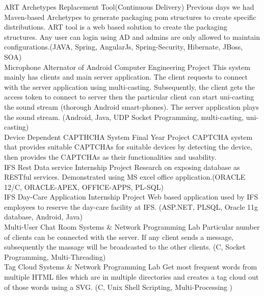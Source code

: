 \documentclass[]{cv-class}
\begin{document}
\begin{entrylist}
	\entry
    {}
	{ART}    
    {Archetypes Replacement Tool(Continuous Delivery)}
{Previous days we had Maven-based Archetypes to generate packaging pom structures to create specific distributions. ART tool is a web based solution to create the packaging structures. Any user can login using AD and admins are only allowed to maintain configurations.(JAVA, Spring, AngularJs, Spring-Security, Hibernate, JBoss, SOA)}
	\\
	\entry
    {}
    {Microphone Alternator of Android}
    {Computer Engineering Project}
    {This system mainly has clients and main server application. The client requests to connect with the server application using multi-casting. Subsequently, the client gets the access token to connect to server then the particular client can start uni-casting the sound stream (thorough Android smart-phones). The server application plays the sound stream. (Android, Java, UDP Socket Programming, multi-casting, uni-casting)}
    \\
	\entry
    {}
    {Device Dependent CAPTHCHA System}
    {Final Year Project}
    {CAPTCHA system that provides suitable CAPTCHAs for suitable devices by  detecting  the  device,  then  provides  the  CAPTCHAs  as  their functionalities and usability.}
	\\
  \entry
    {}
    {IFS Rest Data service}
    {Internship Project}
    {Research on exposing database as  RESTful  services. Demonstrated  using  MS  excel  office  application.(ORACLE 12/C, ORACLE-APEX, OFFICE-APPS, PL-SQL)}
	\\
  \entry
    {}
    {IFS Day-Care Application}
    {Internship Project}
    {Web  based  application  used  by  IFS  employees  to  reserve  the  day-care facility at IFS. (ASP.NET, PLSQL, Oracle 11g database, Android, Java)}
	\\  
  \entry
    {}
    {Multi-User Chat Room}
    {Systems \& Network Programming Lab}
    {Particular number of clients can be connected with the server. If any 
	client  sends  a  message, subsequently  the  massage  will be broadcasted to the other clients. 
	(C, Socket Programming, Multi-Threading)}
	\\
  \entry
    {}
    {Tag Cloud}
    {Systems \& Network Programming Lab}
    {Get most frequent words from multiple HTML files which are in 
	multiple directories and creates a tag cloud out of those words using a 
	SVG. (C, Unix Shell Scripting, Multi-Processing )}
\end{entrylist}
\end{document}
